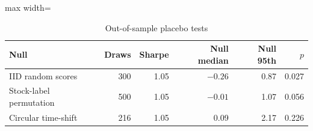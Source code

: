 \begin{table}[t]
\centering\small
\caption{Out-of-sample placebo tests}\label{tab:oos_placebo}
\begin{adjustbox}{max width=\textwidth}\begin{tabular}{lrrrrr}
\toprule
Null & Draws & Sharpe & Null median & Null 95th & $p$\\
\midrule
IID random scores & 300 & 1.05 & $-0.26$ & 0.87 & 0.027\\
Stock-label permutation & 500 & 1.05 & $-0.01$ & 1.07 & 0.056\\
Circular time-shift & 216 & 1.05 & 0.09 & 2.17 & 0.226\\
\bottomrule
\end{tabular}\end{adjustbox}
\end{table}

